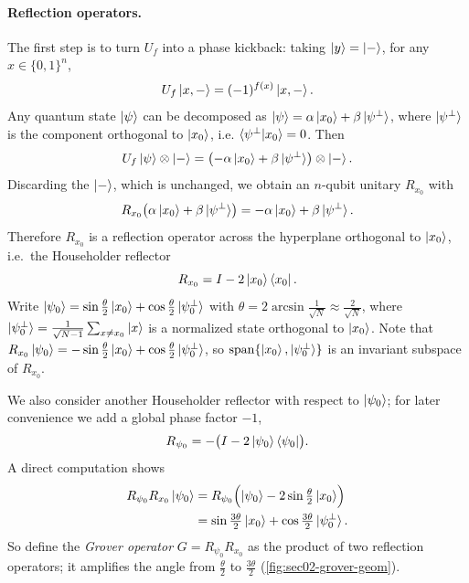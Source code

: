 \paragraph{Reflection operators.}
The first step is to turn $U_f$ into a phase kickback: taking $\ket{y} = \ket{-}$,
for any $x \in \{0,1\}^n$,
\begin{equation}
  U_f\ket{x, -} = (-1)^{f(x)}\ket{x, -}.
\end{equation}
Any quantum state $\ket{\psi}$ can be decomposed as
$\ket{\psi} = \alpha\ket{x_0} + \beta\ket{\psi^\perp}$, where
$\ket{\psi^\perp}$ is the component orthogonal to $\ket{x_0}$, i.e.
$\braket{\psi^\perp | x_0} = 0$. Then
\begin{equation}
  U_f\ket{\psi} \otimes \ket{-} = \bigl(-\alpha\ket{x_0} + \beta\ket{\psi^\perp}\bigr) \otimes \ket{-}.
\end{equation}
Discarding the $\ket{-}$, which is unchanged, we obtain an $n$-qubit unitary
$R_{x_0}$ with
\begin{equation}
  R_{x_0}\bigl(\alpha\ket{x_0} + \beta\ket{\psi^\perp}\bigr) = -\alpha\ket{x_0} + \beta\ket{\psi^\perp}.
\end{equation}
Therefore $R_{x_0}$ is a reflection operator across the hyperplane orthogonal to
$\ket{x_0}$, i.e.\ the Householder reflector
\begin{equation}
  R_{x_0} = I - 2\ket{x_0}\bra{x_0}.
\end{equation}
Write $\ket{\psi_0} = \sin\tfrac{\theta}{2}\ket{x_0} + \cos\tfrac{\theta}{2}\ket{\psi_0^\perp}$
with $\theta = 2\arcsin\tfrac{1}{\sqrt{N}} \approx \tfrac{2}{\sqrt{N}}$, where
$\ket{\psi_0^\perp} = \tfrac{1}{\sqrt{N-1}}\sum_{x \neq x_0}\ket{x}$ is a
normalized state orthogonal to $\ket{x_0}$. Note that
$R_{x_0}\ket{\psi_0} = -\sin\tfrac{\theta}{2}\ket{x_0} + \cos\tfrac{\theta}{2}\ket{\psi_0^\perp}$,
so $\operatorname{span}\{\ket{x_0}, \ket{\psi_0^\perp}\}$ is an invariant subspace
of $R_{x_0}$.

We also consider another Householder reflector with respect to $\ket{\psi_0}$;
for later convenience we add a global phase factor $-1$,
\begin{equation}
  R_{\psi_0} = -\bigl(I - 2\ket{\psi_0}\bra{\psi_0}\bigr).
\end{equation}
A direct computation shows
\begin{align}
  R_{\psi_0} R_{x_0}\ket{\psi_0}
  &= R_{\psi_0}\Bigl(\ket{\psi_0} - 2\sin\tfrac{\theta}{2}\ket{x_0}\Bigr) \notag\\
  &= \sin\tfrac{3\theta}{2}\ket{x_0} + \cos\tfrac{3\theta}{2}\ket{\psi_0^\perp}.
\end{align}
So define the \emph{Grover operator} $G = R_{\psi_0} R_{x_0}$ as the product of
two reflection operators; it amplifies the angle from $\tfrac{\theta}{2}$ to
$\tfrac{3\theta}{2}$ (\cref{fig:sec02-grover-geom}).

